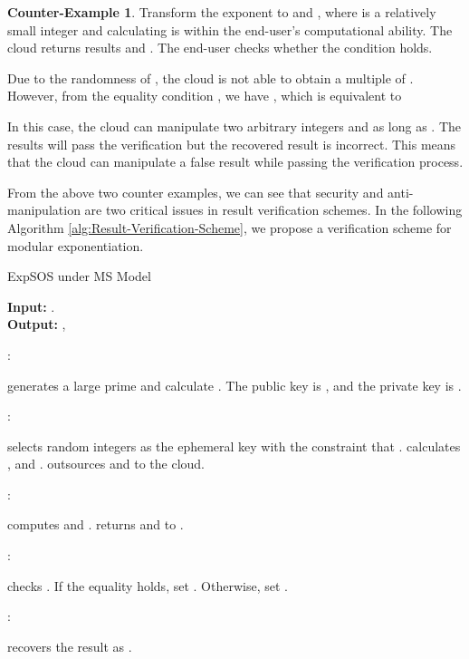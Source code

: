 \documentclass[english,draftcls,onecolumn,11pt]{IEEEtran}
\theoremstyle{definition}
\theoremstyle{plain}
\theoremstyle{plain}
\theoremstyle{definition}
\newtheorem{ctexample}{Counter-Example}
\begin{document}
\begin{ctexample}
Transform the exponent  to  and , where  is a relatively small integer and calculating  is within the end-user's computational ability. The cloud returns results  and . The end-user checks whether the condition  holds.
\end{ctexample}

Due to the randomness of , the cloud is not able to obtain a multiple
of . However, from the equality condition ,
we have , which is
equivalent to 




In this case, the cloud can manipulate two arbitrary integers 
and  as long as .
The results will pass the verification but the recovered result 
is incorrect. This means that the cloud can manipulate a false result
while passing the verification process.

From the above two counter examples, we can see that security and
anti-manipulation are two critical issues in result verification schemes.
In the following Algorithm \ref{alg:Result-Verification-Scheme},
we propose a verification scheme for modular exponentiation.



\begin{algorithm}[tbh] 
\caption{ExpSOS under MS Model\label{alg:Result-Verification-Scheme}}

\smallskip 
\textbf{Input:} .\\
\textbf{Output:} , 

\smallskip 
:
\begin{algorithmic}[1] 
\STATE  generates a large prime  and calculate . 
\STATE The public key is , and the private key is .  
\end{algorithmic} 

\smallskip 
:  
\begin{algorithmic}[1] 
\STATE  selects random integers   as the ephemeral key with the constraint that .
\STATE  calculates ,  and .
\STATE  outsources  and  to the cloud.
\end{algorithmic} 

\smallskip
:
\begin{algorithmic}[1] 
\STATE  computes  and .
\STATE  returns  and  to .
\end{algorithmic} 

\smallskip
:
\begin{algorithmic}[1] 
\STATE  checks .
\STATE If the equality holds, set . Otherwise, set .
\end{algorithmic} 

\smallskip
:
\begin{algorithmic}[1] 
\STATE  recovers the result as .
\end{algorithmic} 
\end{algorithm}
\end{document}
